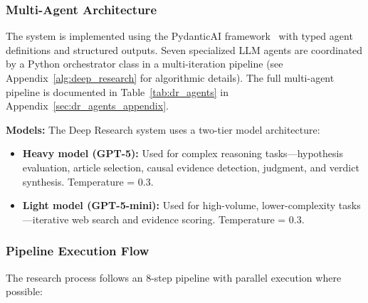 \subsubsection{Multi-Agent Architecture}

The system is implemented using the PydanticAI framework~\cite{pydanticai2024} with typed agent definitions and structured outputs. Seven specialized LLM agents are coordinated by a Python orchestrator class in a multi-iteration pipeline (see Appendix~\ref{alg:deep_research} for algorithmic details). The full multi-agent pipeline is documented in Table~\ref{tab:dr_agents} in Appendix~\ref{sec:dr_agents_appendix}.

\textbf{Models:} The Deep Research system uses a two-tier model architecture:
\begin{itemize}[noitemsep]
    \item \textbf{Heavy model (GPT-5):} Used for complex reasoning tasks---hypothesis evaluation, article selection, causal evidence detection, judgment, and verdict synthesis. Temperature = 0.3.
    \item \textbf{Light model (GPT-5-mini):} Used for high-volume, lower-complexity tasks---iterative web search and evidence scoring. Temperature = 0.3.
\end{itemize}



\subsubsection{Pipeline Execution Flow}

The research process follows an 8-step pipeline with parallel execution where possible:

